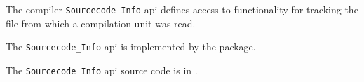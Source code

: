 
The compiler {\tt Sourcecode\_Info} api defines access to functionality for tracking 
the file from which a compilation unit was read.

The {\tt Sourcecode\_Info} api is implemented by the  package.

The {\tt Sourcecode\_Info} api source code is in .
